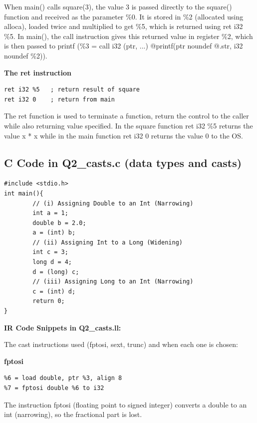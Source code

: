 \documentclass[11pt,a4paper]{article}
\begin{document}
When main() calls square(3), the value 3 is passed directly to the square() function and received as the parameter \%0. It is stored in \%2 (allocated using alloca), loaded twice and multiplied to get \%5, which is returned using ret i32 \%5. In main(), the call instruction gives this returned value in register \%2, which is then passed to printf (\%3 = call i32 (ptr, ...) @printf(ptr noundef @.str, i32 noundef \%2)).


\textbf{The ret instruction}




\begin{lstlisting}
ret i32 %5   ; return result of square
ret i32 0    ; return from main
\end{lstlisting}

The ret function is used to terminate a function, return the control to the caller while also returning value specified. In the square function ret i32 \%5 returns the value x * x while in the main function ret i32 0 returns the value 0 to the OS.


\subsection{C Code in Q2\_casts.c (data types and casts)}

\begin{lstlisting}
#include <stdio.h>
int main(){
        // (i) Assigning Double to an Int (Narrowing)
        int a = 1;
        double b = 2.0;
        a = (int) b;
        // (ii) Assigning Int to a Long (Widening)
        int c = 3;
        long d = 4;
        d = (long) c;
        // (iii) Assigning Long to an Int (Narrowing)
        c = (int) d;
        return 0;
}
\end{lstlisting}

\medskip\noindent\textbf{IR Code Snippets in Q2\_casts.ll:}\par

The cast instructions used (fptosi, sext, trunc) and when each one is chosen:


\textbf{fptosi}




\begin{lstlisting}
%6 = load double, ptr %3, align 8
%7 = fptosi double %6 to i32
\end{lstlisting}

The instruction fptosi (floating point to signed integer) converts a double to an int (narrowing), so the fractional part is lost.
\end{document}
